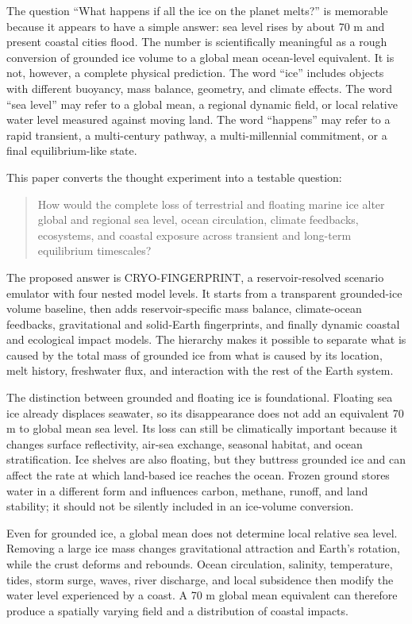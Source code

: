 \documentclass[conference]{IEEEtran}
\begin{document}
The question ``What happens if all the ice on the planet melts?'' is memorable because it appears to have a simple answer: sea level rises by about 70 m and present coastal cities flood. The number is scientifically meaningful as a rough conversion of grounded ice volume to a global mean ocean-level equivalent. It is not, however, a complete physical prediction. The word ``ice'' includes objects with different buoyancy, mass balance, geometry, and climate effects. The word ``sea level'' may refer to a global mean, a regional dynamic field, or local relative water level measured against moving land. The word ``happens'' may refer to a rapid transient, a multi-century pathway, a multi-millennial commitment, or a final equilibrium-like state.

This paper converts the thought experiment into a testable question:

\begin{quote}
How would the complete loss of terrestrial and floating marine ice alter global and regional sea level, ocean circulation, climate feedbacks, ecosystems, and coastal exposure across transient and long-term equilibrium timescales?
\end{quote}

The proposed answer is CRYO-FINGERPRINT, a reservoir-resolved scenario emulator with four nested model levels. It starts from a transparent grounded-ice volume baseline, then adds reservoir-specific mass balance, climate-ocean feedbacks, gravitational and solid-Earth fingerprints, and finally dynamic coastal and ecological impact models. The hierarchy makes it possible to separate what is caused by the total mass of grounded ice from what is caused by its location, melt history, freshwater flux, and interaction with the rest of the Earth system.

The distinction between grounded and floating ice is foundational. Floating sea ice already displaces seawater, so its disappearance does not add an equivalent 70 m to global mean sea level. Its loss can still be climatically important because it changes surface reflectivity, air-sea exchange, seasonal habitat, and ocean stratification. Ice shelves are also floating, but they buttress grounded ice and can affect the rate at which land-based ice reaches the ocean. Frozen ground stores water in a different form and influences carbon, methane, runoff, and land stability; it should not be silently included in an ice-volume conversion.

Even for grounded ice, a global mean does not determine local relative sea level. Removing a large ice mass changes gravitational attraction and Earth's rotation, while the crust deforms and rebounds. Ocean circulation, salinity, temperature, tides, storm surge, waves, river discharge, and local subsidence then modify the water level experienced by a coast. A 70 m global mean equivalent can therefore produce a spatially varying field and a distribution of coastal impacts.
\end{document}
